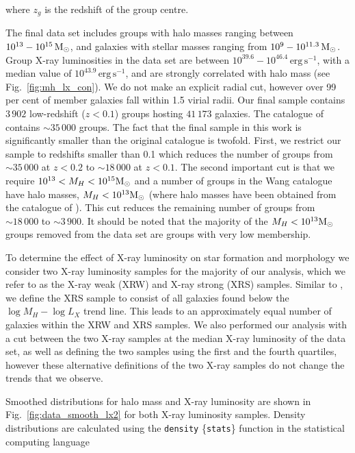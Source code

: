\noindent
where $z_g$ is the redshift of the group centre.
\par
The final data set includes groups with halo masses ranging between
$10^{13} - 10^{15}\,\mathrm{M_{\odot}}$, and galaxies with stellar masses ranging
from $10^9 - 10^{11.3}\,\mathrm{M_{\odot}}$.  Group X-ray luminosities in the data
set are between $10^{39.6} -
10^{46.4}\,\mathrm{erg}\,\mathrm{s^{-1}}$, with a median value of
$10^{43.9}\,\mathrm{erg}\,\mathrm{s^{-1}}$, and are strongly
correlated with halo mass (see Fig.~\ref{fig:mh_lx_con}).  We do not
make an explicit radial cut, however over 99 per cent of member
galaxies fall within 1.5 virial radii.  Our final sample contains
$3\,902$ low-redshift ($z < 0.1$) groups hosting $41\,173$ galaxies.
The catalogue of \citet{wang2014} contains $\sim 35\,000$ groups.  The
fact that the final sample in this work is significantly smaller than
the original catalogue is twofold.  First, we restrict our sample to
redshifts smaller than 0.1 which reduces the number of groups from
$\sim 35\,000$ at $z < 0.2$ to $\sim 18\,000$ at $z < 0.1$.  The
second important cut is that we require $10^{13} < M_H < 10^{15}\mathrm{M_{\odot}}$
and a number of groups in the Wang catalogue have halo masses, $M_H <
10^{13}\mathrm{M_{\odot}}$ (where halo masses have been obtained from the catalogue
of \citealt{yang2007}).  This cut reduces the remaining number of
groups from $\sim 18\,000$ to $\sim 3\,900$.  It should be noted that
the majority of the $M_H < 10^{13}\mathrm{M_{\odot}}$ groups removed from the data
set are groups with very low membership.
\par
To determine the effect of X-ray luminosity on star formation and
morphology we consider two X-ray luminosity samples for the majority
of our analysis, which we refer to as the X-ray weak (XRW) and X-ray
strong (XRS) samples.  Similar to \citet{wang2014}, we define the XRS
sample to consist of all galaxies found below the $\log M_H - \log
L_X$ trend line.  This leads to an approximately equal number of
galaxies within the XRW and XRS samples.  We also performed our
analysis with a cut between the two X-ray samples at the median X-ray
luminosity of the data set, as well as defining the two samples using
the first and the fourth quartiles, however these alternative
definitions of the two X-ray samples do not change the trends that we
observe.
\par
Smoothed distributions for halo mass and X-ray luminosity are shown in
Fig.~\ref{fig:data_smooth_lx2} for both X-ray luminosity samples.
Density distributions are calculated using the \texttt{density}
\{\texttt{stats}\} function in the statistical computing language
